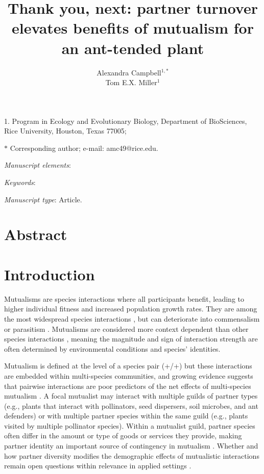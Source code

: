 \documentclass[11pt]{article}
\title{Thank you, next: partner turnover elevates benefits of mutualism for an ant-tended plant}
\author{Alexandra Campbell$^{1,\ast}$ \\ 
	Tom E.X. Miller$^{1}$}
\date{}
\begin{document}
	
	\maketitle
	
	\noindent{} 1. Program in Ecology and Evolutionary Biology, Department of BioSciences, Rice University, Houston, Texas 77005;
	
	\noindent{} $\ast$ Corresponding author; e-mail: amc49@rice.edu.
	
	
	\textit{Manuscript elements}: 
	
	\bigskip
	
	\textit{Keywords}: 
	
	\bigskip
	
	\textit{Manuscript type}: Article.
	
	\bigskip
	
	
\linenumbers{}
\modulolinenumbers[3]

\newpage{}

\section*{Abstract}


\newpage{}

\section*{Introduction}

Mutualisms are species interactions where all participants benefit, leading to higher individual fitness and increased population growth rates. 
They are among the most widespread species interactions \citep{Bronstein1994,Chamberlain2014,Frederickson2013}, but can deteriorate into commensalism or parasitism  \citep{Rodriguez-Rodriguez2017,Song2020,Mandyam2014,Thrall2007, Bahia2022}.
Mutualisms are considered more context dependent than other species interactions \citep{Chamberlain2014,Frederickson2013}, meaning the magnitude and sign of interaction strength are often determined by environmental conditions and species' identities.

Mutualism is defined at the level of a species pair (+/+) but these interactions are embedded within multi-species communities, and growing evidence suggests that pairwise interactions are poor predictors of the net effects of multi-species mutualism \citep{Afkhami2014,Palmer2010}. 
A focal mutualist may interact with multiple guilds of partner types (e.g., plants that interact with pollinators, seed dispersers, soil microbes, and ant defenders) or with multiple partner species within the same guild (e.g., plants visited by multiple pollinator species). 
Within a mutualist guild, partner species often differ in the amount or type of goods or services they provide, making partner identity an important source of contingency in mutualism \citep{Stanton2003}. 
Whether and how partner diversity modifies the demographic effects of mutualistic interactions remain open questions within relevance in applied settings \citep{rogers2014}. 
\end{document}
